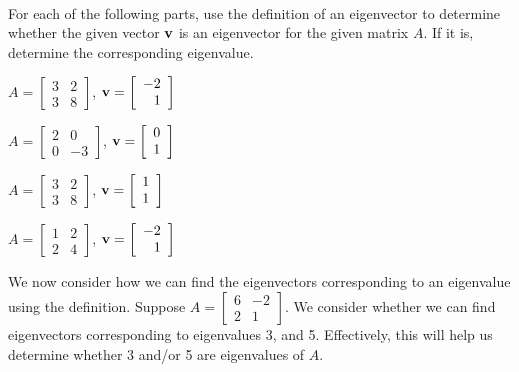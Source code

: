 \begin{pa} \label{pa:2_b_1} ~
\be
\item For each of the following parts, use the definition of an eigenvector to determine whether the given vector $\mathbf{v}$ is an eigenvector for the given matrix $A$. If it is, determine the corresponding eigenvalue. 

\ba
\item $A=\left[ \begin{array}{cc} 3 &2 \\ 3 & 8 \end{array} \right]$, $\mathbf{v}=\left[ \begin{array}{r} -2\\1 \end{array} \right]$

\item $A=\left[ \begin{array}{cr} 2 & 0 \\ 0 & -3 \end{array} \right]$, $\mathbf{v}=\left[ \begin{array}{c} 0\\1 \end{array} \right]$

\item $A=\left[ \begin{array}{cc} 3 &2 \\ 3 & 8 \end{array} \right]$, $\mathbf{v}=\left[ \begin{array}{c} 1\\1 \end{array} \right]$

\item $A=\left[ \begin{array}{cc} 1 &2 \\ 2 & 4 \end{array} \right]$, $\mathbf{v}=\left[ \begin{array}{r} -2\\1 \end{array} \right]$ 

\ea

\item We now consider how we can find the eigenvectors corresponding to an eigenvalue using the definition. Suppose $A=\left[ \begin{array}{cr} 6 & -2\\2 & 1 \end{array} \right]$. We consider whether we can find eigenvectors corresponding to eigenvalues 3, and 5. Effectively, this will help us determine whether 3 and/or 5 are eigenvalues of $A$.


\end{pa}
